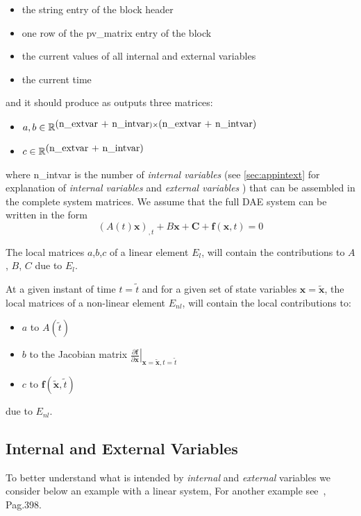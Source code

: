 \documentclass{scrartcl}
\let\tt=\normalfont\ttfamily
\begin{document}
\begin{itemize}
\item  the string entry of the block header
\item  one row of the {\tt pv\_matrix} entry of the block
\item  the current values of all internal and external variables
\item  the current time
\end{itemize} 

and it should produce as outputs three matrices: 
\begin{itemize}
\item  $a,b \in \mathbb{R}^{
\mbox{\tt (n\_extvar + n\_intvar})\times \mbox{\tt (n\_extvar + n\_intvar)}}$ 
\item $c\in \mathbb{R}^{\mbox{\tt (n\_extvar + n\_intvar)}} $ 
\end{itemize}


where {\tt n\_intvar} is the number of \emph{internal variables} 
(see \autoref{sec:appintext} for explanation of \emph{internal variables} and
 \emph{external variables} )
that can be assembled in the complete system matrices.
We assume that the full DAE system can be written in the form
\begin{equation}\label{eqdaesystem}
\left(A(t) \mathbf{x}\right)_{,t} + 
B \mathbf{x} + \mathbf{C} + \mathbf{f}(\mathbf{x},t)= 0
\end{equation}

The local matrices $a$,$b$,$c$ of a linear element $E_{l}$, 
will contain the contributions to $A$, $B$, $C$  due to
$E_{l}$.

At a given instant of time $t=\tilde{t}$ and for a given set of state 
variables $\mathbf{x}=\mathbf{\tilde{x}}$,
the local matrices of a non-linear element $E_{nl}$, 
will contain the local contributions to:
\begin{itemize}
\item $a$ to $A(\tilde{t})$
\item $b$ to the Jacobian matrix 
$\left.\frac{\partial \mathbf{f}}{\partial\mathbf{x}}\right|_{\mathbf{x}=
  \mathbf{\tilde{x}},t=\tilde{t}}$ 
\item $c$ to $\mathbf{f}(\mathbf{\tilde{x}},\tilde{t})$ 
\end{itemize}
due to $E_{nl}$.


\subsection{Internal and External Variables}\label{sec:appintext}
To better understand what is intended by \emph{internal} and \emph{external}
variables we consider below an example with a linear system,
For another example see~\cite{freund99}, Pag.398.
\end{document}
